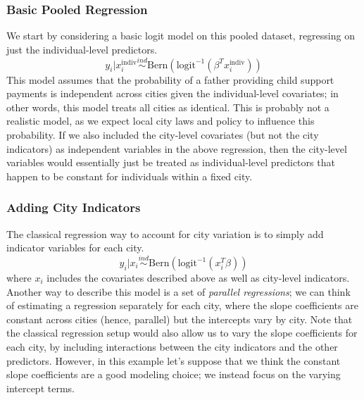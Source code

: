 \documentclass[12pt]{article}
\begin{document}
\subsubsection{Basic Pooled Regression}
We start by considering a basic logit model on this pooled dataset, regressing on just the individual-level predictors. 
\[y_i|x_i^{\text{indiv}} \overset{ind}{\sim} \text{Bern}(\text{logit}^{-1}(\beta^T x_i^{\text{indiv}})) \]
This model assumes that the probability of a father providing child support payments is independent across cities given the individual-level covariates; in other words, this model treats all cities as identical. 
This is probably not a realistic model, as we expect local city laws and policy to influence this probability. If we also included the city-level covariates (but not the city indicators) as independent variables in the above regression, then the city-level variables would essentially just be treated as individual-level predictors that happen to be constant for individuals within a fixed city. 

\subsubsection{Adding City Indicators}
The classical regression way to account for city variation is to simply add indicator variables for each city. 
\[y_i|x_i \overset{ind}{\sim} \text{Bern}(\text{logit}^{-1}(x_i^T \beta)) \]
where $x_i$ includes the covariates described above as well as city-level indicators. Another way to describe this model is a set of \textit{parallel regressions}; we can think of estimating a regression 
separately for each city, where the slope coefficients are constant across cities (hence, parallel) but the intercepts vary by city. Note that the classical regression setup would also allow us to vary the 
slope coefficients for each city, by including interactions between the city indicators and the other predictors. However, in this example let's suppose that we think the constant slope coefficients are a good 
modeling choice; we instead focus on the varying intercept terms. 
\end{document}
